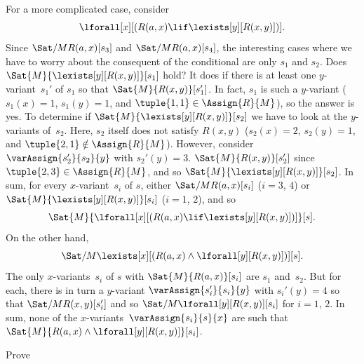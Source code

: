 \documentclass[../../../include/open-logic-section]{subfiles}
\begin{document}
\begin{ex}
For a more complicated case, consider
\[
\lforall[x][(R(a,x) \lif \lexists[y][R(x,y)])].
\]
Since $\Sat/{M}{R(a,x)}[s_3]$ and $\Sat/{M}{R(a,x)}[s_4]$, the
interesting cases where we have to worry about the consequent of the
conditional are only $s_1$ and $s_2$. Does
$\Sat{M}{\lexists[y][R(x,y)]}[s_1]$ hold? It does if there is at least
one $y$-variant~$s_1'$ of $s_1$ so that $\Sat{M}{R(x,y)}[s_1']$. In
fact, $s_1$ is such a $y$-variant ($s_1(x) = 1$, $s_1(y) = 1$, and
$\tuple{1,1} \in \Assign{R}{M}$), so the answer is yes. To determine
if $\Sat{M}{\lexists[y][R(x,y)]}[s_2]$ we have to look at the
$y$-variants of~$s_2$. Here, $s_2$ itself does not satisfy $R(x,y)$
($s_2(x) = 2$, $s_2(y) = 1$, and $\tuple{2,1}\notin
\Assign{R}{M}$). However, consider $\varAssign{s_2'}{s_2}{y}$ with $s_2'(y) =
3$. $\Sat{M}{R(x,y)}[s_2']$ since $\tuple{2,3} \in \Assign{R}{M}$, and
so $\Sat{M}{\lexists[y][R(x,y)]}[s_2]$. In sum, for every
$x$-variant~$s_i$ of $s$, either $\Sat/{M}{R(a,x)}[s_i]$ ($i = 3$,
$4$) or $\Sat{M}{\lexists[y][R(x,y)]}[s_i]$ ($i = 1$, $2$), and so
\[
\Sat{M}{\lforall[x][(R(a,x) \lif \lexists[y][R(x,y)])]}[s].
\]
On the other hand,
\[
\Sat/{M}{\lexists[x][(R(a,x) \land \lforall[y][R(x,y)])]}[s].
\]
The only $x$-variants~$s_i$ of $s$ with $\Sat{M}{R(a,x)}[s_i]$ are
$s_1$ and~$s_2$. But for each, there is in turn a $y$-variant 
$\varAssign{s_i'}{s_i}{y}$ with $s_i'(y) = 4$ so that $\Sat/{M}{R(x,y)}[s_i']$ 
and so $\Sat/{M}{\lforall[y][R(x,y)]}[s_i]$ for $i = 1$, $2$. In sum, 
none of the $x$-variants~$\varAssign{s_i}{s}{x}$ are such that $\Sat{M}{R(a,x) \land
  \lforall[y][R(x,y)]}[s_i]$.
\end{ex}


\begin{prob}
  Prove 
\end{prob}
\tagendprob

\end{document}
